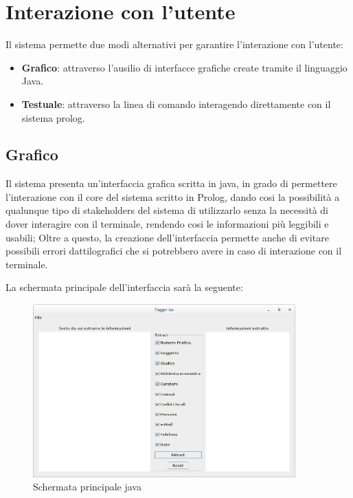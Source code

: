 
\section{Interazione con l'utente}
Il sistema permette due modi alternativi per garantire l'interazione con l'utente:
\begin{itemize}
	\item \textbf{Grafico}: attraverso l'ausilio di interfacce grafiche create tramite il linguaggio Java.
	\item \textbf{Testuale}: attraverso la linea di comando interagendo direttamente con il sistema prolog.
\end{itemize}
\subsection{Grafico}
Il sistema presenta un'interfaccia grafica scritta in java, in grado di permettere l'interazione con il core del sistema scritto in Prolog, dando cosi la possibilità a qualunque tipo di stakeholders del sistema di utilizzarlo senza la necessità di dover interagire con il terminale, rendendo cosi le informazioni più leggibili e usabili; Oltre a questo, la creazione dell'interfaccia permette anche di evitare possibili errori dattilografici che si potrebbero avere in caso di interazione con il terminale.

La schermata principale dell'interfaccia sarà la seguente:
\begin{figure}[H]
	\centering
	\includegraphics[width=0.9\textwidth]{img/interfaces/java-main.png}
	\caption[Schermata java main]{Schermata principale java}
	\label{java-main}
\end{figure}

